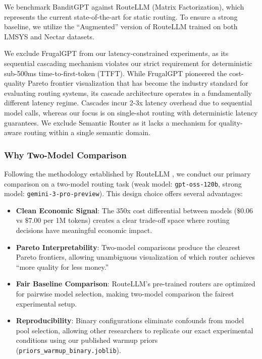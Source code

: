 We benchmark BanditGPT against RouteLLM (Matrix Factorization), which represents the current state-of-the-art for static routing. To ensure a strong baseline, we utilize the ``Augmented'' version of RouteLLM trained on both LMSYS and Nectar datasets.

We exclude FrugalGPT from our latency-constrained experiments, as its sequential cascading mechanism violates our strict requirement for deterministic sub-500ms time-to-first-token (TTFT). While FrugalGPT pioneered the cost-quality Pareto frontier visualization that has become the industry standard for evaluating routing systems, its cascade architecture operates in a fundamentally different latency regime. Cascades incur 2-3x latency overhead due to sequential model calls, whereas our focus is on single-shot routing with deterministic latency guarantees. We exclude Semantic Router as it lacks a mechanism for quality-aware routing within a single semantic domain.

\subsubsection{Why Two-Model Comparison}

Following the methodology established by RouteLLM \cite{ong2024routellm}, we conduct our primary comparison on a two-model routing task (weak model: \texttt{gpt-oss-120b}, strong model: \texttt{gemini-3-pro-preview}). This design choice offers several advantages:

\begin{itemize}
    \item \textbf{Clean Economic Signal}: The 350x cost differential between models ($\$0.06$ vs $\$7.00$ per 1M tokens) creates a clear trade-off space where routing decisions have meaningful economic impact.
    \item \textbf{Pareto Interpretability}: Two-model comparisons produce the clearest Pareto frontiers, allowing unambiguous visualization of which router achieves ``more quality for less money.''
    \item \textbf{Fair Baseline Comparison}: RouteLLM's pre-trained routers are optimized for pairwise model selection, making two-model comparison the fairest experimental setup.
    \item \textbf{Reproducibility}: Binary configurations eliminate confounds from model pool selection, allowing other researchers to replicate our exact experimental conditions using our published warmup priors (\texttt{priors\_warmup\_binary.joblib}).
\end{itemize}


